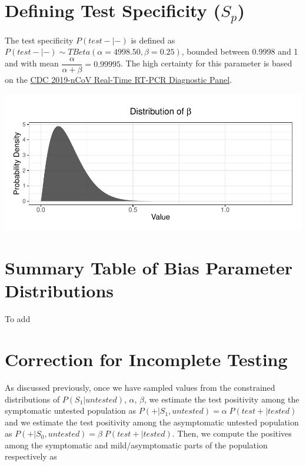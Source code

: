 \documentclass[12pt,twoside]{smiththesis}
\begin{document}
\hypertarget{defining-test-specificity-s_p}{%
\section{\texorpdfstring{Defining Test Specificity (\(S_p\))}{Defining Test Specificity (S\_p)}}\label{defining-test-specificity-s_p}}

The test specificity \(P(test -| -)\) is defined as \(P(test -|- )\sim TBeta(\alpha = 4998.50, \beta = 0.25)\), bounded between 0.9998 and 1 and with mean \(\dfrac{\alpha}{\alpha + \beta} = 0.99995\). The high certainty for this parameter is based on the \href{https://www.fda.gov/media/134922/download}{CDC 2019-nCoV Real-Time RT-PCR Diagnostic Panel}.
\begin{center}\includegraphics[width=0.8\linewidth]{thesis_files/figure-latex/unnamed-chunk-59-1} \end{center}

\hypertarget{summary-table-of-bias-parameter-distributions}{%
\section{Summary Table of Bias Parameter Distributions}\label{summary-table-of-bias-parameter-distributions}}

To add

\hypertarget{correction-for-incomplete-testing}{%
\section{Correction for Incomplete Testing}\label{correction-for-incomplete-testing}}

As discussed previously, once we have sampled values from the constrained distributions of \(P(S_1|untested)\), \(\alpha\), \(\beta\), we estimate the test positivity among the symptomatic untested population as \(P(+|S_1,untested) = \alpha \; P(test +|tested)\) and we estimate the test positivity among the asymptomatic untested population as \(P(+|S_0,untested) = \beta \; P(test +|tested)\). Then, we compute the positives among the symptomatic and mild/asymptomatic parts of the population respectively as
\end{document}
